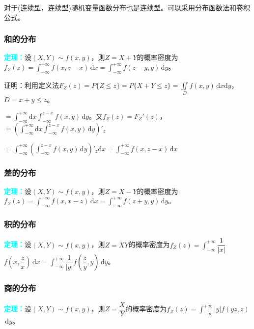 \documentclass[UTF8, 12pt]{ctexart}
\begin{document}
对于(连续型，连续型)随机变量函数分布也是连续型。可以采用分布函数法和卷积公式。

\subsubsection{和的分布}

\textcolor{aqua}{\textbf{定理：}}设$(X,Y)\sim f(x,y)$，则$Z=X+Y$的概率密度为$f_Z(z)=\int_{-\infty}^{+\infty}f(x,z-x)\,\textrm{d}x=\int_{-\infty}^{+\infty}f(z-y,y)\,\textrm{d}y$。

证明：利用定义法$F_Z(z)=P\{Z\leqslant z\}=P\{X+Y\leqslant z\}=\iint\limits_Df(x,y)\,\textrm{d}x\textrm{d}y$，$D=x+y\leqslant z$。

$=\int_{-\infty}^{+\infty}\textrm{d}x\int_{-\infty}^{z-x}f(x,y)\,\textrm{d}y$。又$f_Z(z)=F_Z'(z)$，$=(\int_{-\infty}^{+\infty}\textrm{d}x\int_{-\infty}^{z-x}f(x,y)\,\textrm{d}y)'_z$

$=\int_{-\infty}^{+\infty}(\int_{-\infty}^{z-x}f(x,y)\,\textrm{d}y)'_z\textrm{d}x=\int_{-\infty}^{+\infty}f(x,z-x)\,\textrm{d}x$

\subsubsection{差的分布}

\textcolor{aqua}{\textbf{定理：}}设$(X,Y)\sim f(x,y)$，则$Z=X-Y$的概率密度为$f_Z(z)=\int_{-\infty}^{+\infty}f(x,x-z)\,\textrm{d}x=\int_{-\infty}^{+\infty}f(z+y,y)\,\textrm{d}y$。

\subsubsection{积的分布}

\textcolor{aqua}{\textbf{定理：}}设$(X,Y)\sim f(x,y)$，则$Z=XY$的概率密度为$f_Z(z)=\displaystyle{\int_{-\infty}^{+\infty}}\dfrac{1}{\vert x\vert}$\\$f\left(x,\dfrac{z}{x}\right)\,\textrm{d}x=\displaystyle{\int_{-\infty}^{+\infty}}\dfrac{1}{\vert y\vert}f\left(\dfrac{z}{y},y\right)\,\textrm{d}y$。

\subsubsection{商的分布}

\textcolor{aqua}{\textbf{定理：}}设$(X,Y)\sim f(x,y)$，则$Z=\dfrac{X}{Y}$的概率密度为$f_Z(z)=\displaystyle{\int_{-\infty}^{+\infty}}\vert y\vert f(yz,z)$\\$\,\textrm{d}y$。
\end{document}
